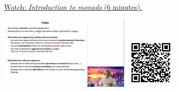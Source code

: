 
\begin{minipage}{10cm}
    \href{https://act4e-spring21.netlify.app/videos/spring2021-monads-a:intro-monad.html}{Watch: \emph{Introduction to monads} (6 minutes).}
        
    \href{https://act4e-spring21.netlify.app/videos/spring2021-monads-a:intro-monad.html}{\includegraphics[height=3.5cm]{spring2021-monads-a:intro-monad/thumbnails.jpg}}
    \href{https://act4e-spring21.netlify.app/videos/spring2021-monads-a:intro-monad.html}{\includegraphics[height=2.5cm]{spring2021-monads-a:intro-monad/qrcode.png}}
\end{minipage}
